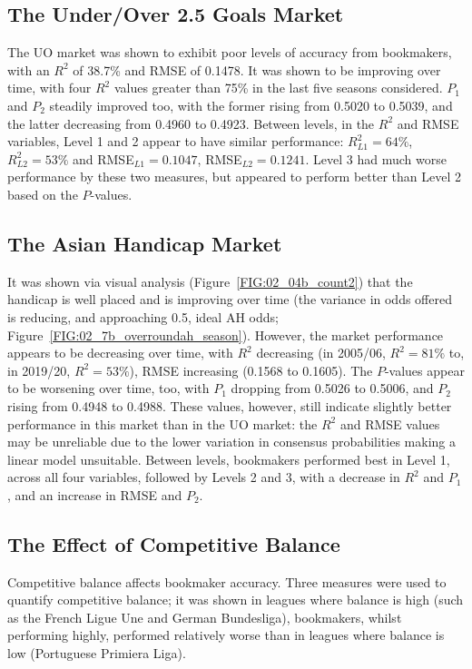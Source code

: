 \documentclass[a4paper,10pt]{report}
\begin{document}
\subsection*{The Under/Over 2.5 Goals Market}
The UO market was shown to exhibit poor levels of accuracy from bookmakers, with an $R^2$ of 38.7\% and RMSE of 0.1478. It was shown to be improving over time, with four $R^2$ values greater than 75\% in the last five seasons considered. $P_1$ and $P_2$ steadily improved too, with the former rising from 0.5020 to 0.5039, and the latter decreasing from 0.4960 to 0.4923. Between levels, in the $R^2$ and RMSE variables, Level 1 and 2 appear to have similar performance: $R^2_{L1}=64\%$, $R^2_{L2}=53\%$ and RMSE$_{L1} = 0.1047$, RMSE$_{L2} = 0.1241$. Level 3 had much worse performance by these two measures, but appeared to perform better than Level 2 based on the $P$-values. 

\subsection*{The Asian Handicap Market}
It was shown via visual analysis (Figure~\ref{FIG:02_04b_count2}) that the handicap is well placed and is improving over time (the variance in odds offered is reducing, and approaching 0.5, ideal AH odds; Figure~\ref{FIG:02_7b_overroundah_season}). However, the market performance appears to be decreasing over time, with $R^2$ decreasing (in 2005/06, $R^2=81\%$ to, in 2019/20, $R^2=53\%$), RMSE increasing (0.1568 to 0.1605). The $P$-values appear to be worsening over time, too, with $P_1$ dropping from 0.5026 to 0.5006, and $P_2$ rising from 0.4948 to 0.4988. These values, however, still indicate slightly better performance in this market than in the UO market: the $R^2$ and RMSE values may be unreliable due to the lower variation in consensus probabilities making a linear model unsuitable. Between levels, bookmakers performed best in Level 1, across all four variables, followed by Levels 2 and 3, with a decrease in $R^2$ and $P_1$, and an increase in RMSE and $P_2$.

\subsection*{The Effect of Competitive Balance}
Competitive balance affects bookmaker accuracy. Three measures were used to quantify competitive balance; it was shown in leagues where balance is high (such as the French Ligue Une and German Bundesliga), bookmakers, whilst performing highly, performed relatively worse than in leagues where balance is low (Portuguese Primiera Liga).
\end{document}
